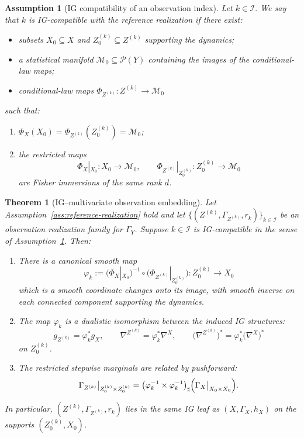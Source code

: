 \documentclass[11pt]{article}
\newtheorem{assumption}{Assumption}
\newtheorem{theorem}{Theorem}
\newcommand{\Pcal}{\mathcal{P}}
\begin{document}
\begin{assumption}[IG compatibility of an observation index]
\label{ass:ig-compatibility-observation}
Let $k\in\mathcal I$. We say that $k$ is \emph{IG-compatible} with the
reference realization if there exist:
\begin{itemize}[leftmargin=1.6em]
  \item subsets $X_0\subseteq X$ and $Z^{(k)}_0\subseteq Z^{(k)}$
  supporting the dynamics;
  \item a statistical manifold
  $\mathcal M_0 \subseteq \Pcal(Y)$ containing the images of the
  conditional-law maps;
  \item conditional-law maps
  $\Phi_{Z^{(k)}} : Z^{(k)} \to \mathcal M_0$
\end{itemize}
such that:
\begin{enumerate}[label=(IC\arabic*),leftmargin=1.8em]
  \item $\Phi_X(X_0) = \Phi_{Z^{(k)}}(Z^{(k)}_0) = \mathcal M_0$;
  \item the restricted maps
  \[
    \Phi_X|_{X_0} : X_0 \to \mathcal M_0,
    \qquad
    \Phi_{Z^{(k)}}|_{Z^{(k)}_0} : Z^{(k)}_0 \to \mathcal M_0
  \]
  are Fisher immersions of the same rank $d$.
\end{enumerate}
\end{assumption}

\begin{theorem}[IG--multivariate observation embedding]
\label{thm:ig-observation-embedding}
Let Assumption~\ref{ass:reference-realization} hold and let
$\{(Z^{(k)},\Gamma_{Z^{(k)}},r_k)\}_{k\in\mathcal I}$ be an observation
realization family for $\Gamma_Y$. Suppose $k\in\mathcal I$ is
IG-compatible in the sense of
Assumption~\ref{ass:ig-compatibility-observation}. Then:
\begin{enumerate}[label=(\alph*),leftmargin=1.8em]
  \item There is a canonical smooth map
  \[
    \varphi_k
    :=
    \bigl(\Phi_X|_{X_0}\bigr)^{-1}
    \circ
    \bigl(\Phi_{Z^{(k)}}|_{Z^{(k)}_0}\bigr)
    : Z^{(k)}_0 \longrightarrow X_0
  \]
  which is a smooth coordinate changes onto its image, with smooth inverse on each
  connected component supporting the dynamics.
  \item The map $\varphi_k$ is a dualistic isomorphism between the
  induced IG structures:
  \[
    g_{Z^{(k)}} = \varphi_k^\ast g_X,
    \qquad
    \nabla^{Z^{(k)}} = \varphi_k^\ast \nabla^X,
    \qquad
    \bigl(\nabla^{Z^{(k)}}\bigr)^\ast
      = \varphi_k^\ast \bigl(\nabla^X\bigr)^\ast
  \]
  on $Z^{(k)}_0$.
  \item The restricted stepwise marginals are related by pushforward:
  \[
    \Gamma_{Z^{(k)}}\big|_{Z^{(k)}_0\times Z^{(k)}_0}
    =
    \bigl(\varphi_k^{-1}\times\varphi_k^{-1}\bigr)_{\sharp}
    \Bigl(\Gamma_X\big|_{X_0\times X_0}\Bigr).
  \]
\end{enumerate}
In particular, $(Z^{(k)},\Gamma_{Z^{(k)}},r_k)$ lies in the same IG leaf
as $(X,\Gamma_X,h_X)$ on the supports $(Z^{(k)}_0,X_0)$.
\end{theorem}
\end{document}
